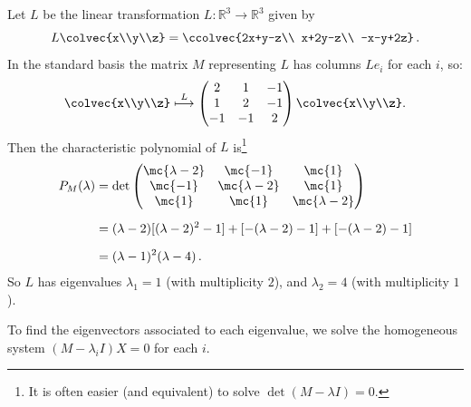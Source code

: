 \begin{example}
Let $L$ be the linear transformation $L \colon \mathbb{R}^3\rightarrow \mathbb{R}^3$ given by 
\[L\colvec{x\\y\\z}=\ccolvec{2x+y-z\\ x+2y-z\\ -x-y+2z}\, .\] 
In the standard basis the matrix $M$ representing $L$ has columns $Le_i$ for each $i$, so:
\[
\colvec{x\\y\\z} \stackrel{L}{\longmapsto} 
\begin{pmatrix}
2 & 1 & -1\\
1 & 2 & -1\\
-1 & -1 & 2\\
\end{pmatrix}\colvec{x\\y\\z}.
\]
Then the characteristic polynomial of $L$ is\footnote{It is often easier (and equivalent) to solve $\det (M-\lambda I)=0$.}
\begin{align*}
P_M(\lambda)&=\det \begin{pmatrix}
\mc{\lambda - 2} &\mc{ -1} & \mc{1}\\
\mc{-1} &\mc{ \lambda - 2} & \mc{1}\\
\mc{1} & \mc{1} & \mc{\lambda - 2}\\
\end{pmatrix}\\[2mm]
&= (\lambda - 2)[ (\lambda - 2)^2-1 ] + 
[-(\lambda - 2)-1 ] +
[-(\lambda - 2)-1] \\[2mm]
&= (\lambda - 1)^2(\lambda - 4)\, .
\end{align*}
So $L$ has eigenvalues $\lambda_1=1$ (with multiplicity $2$), and $\lambda_2=4$ (with multiplicity $1$).

To find the eigenvectors associated to each eigenvalue, we solve the homogeneous system $(M-\lambda_iI)X=0$ for each $i$.


\end{example}
